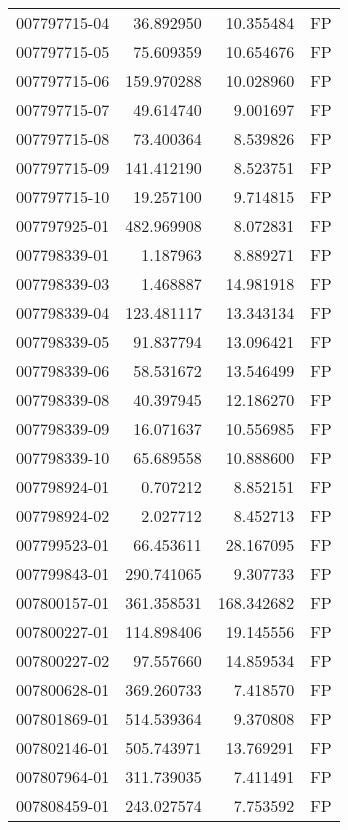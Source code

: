 \begin{tabular}{lrrl}
007797715-04 &   36.892950 &      10.355484 &   FP \\
007797715-05 &   75.609359 &      10.654676 &   FP \\
007797715-06 &  159.970288 &      10.028960 &   FP \\
007797715-07 &   49.614740 &       9.001697 &   FP \\
007797715-08 &   73.400364 &       8.539826 &   FP \\
007797715-09 &  141.412190 &       8.523751 &   FP \\
007797715-10 &   19.257100 &       9.714815 &   FP \\
007797925-01 &  482.969908 &       8.072831 &   FP \\
007798339-01 &    1.187963 &       8.889271 &   FP \\
007798339-03 &    1.468887 &      14.981918 &   FP \\
007798339-04 &  123.481117 &      13.343134 &   FP \\
007798339-05 &   91.837794 &      13.096421 &   FP \\
007798339-06 &   58.531672 &      13.546499 &   FP \\
007798339-08 &   40.397945 &      12.186270 &   FP \\
007798339-09 &   16.071637 &      10.556985 &   FP \\
007798339-10 &   65.689558 &      10.888600 &   FP \\
007798924-01 &    0.707212 &       8.852151 &   FP \\
007798924-02 &    2.027712 &       8.452713 &   FP \\
007799523-01 &   66.453611 &      28.167095 &   FP \\
007799843-01 &  290.741065 &       9.307733 &   FP \\
007800157-01 &  361.358531 &     168.342682 &   FP \\
007800227-01 &  114.898406 &      19.145556 &   FP \\
007800227-02 &   97.557660 &      14.859534 &   FP \\
007800628-01 &  369.260733 &       7.418570 &   FP \\
007801869-01 &  514.539364 &       9.370808 &   FP \\
007802146-01 &  505.743971 &      13.769291 &   FP \\
007807964-01 &  311.739035 &       7.411491 &   FP \\
007808459-01 &  243.027574 &       7.753592 &   FP \\

\end{tabular}
